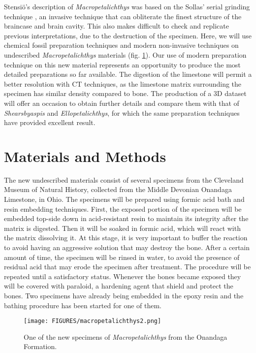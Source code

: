 \documentclass[11pt,letterpaper]{report}
\begin{document}
Stensi{\"o}'s description of \textit{Macropetalichthys} was based on the Sollas' serial grinding technique \citep{sollas1904method,Sollas201}, an invasive technique that can obliterate the finest structure of the braincase and brain cavity. This also makes difficult to check and replicate previous interpretations, due to the destruction of the specimen. Here, we will use chemical fossil preparation techniques and modern non-invasive techniques on undescribed \textit{Macropetalichthys} materials (fig. \ref{macro}). Our use of modern preparation technique on this new material represents an opportunity to produce the most detailed preparations so far available. The digestion of the limestone will permit a better resolution with CT techniques, as the limestone matrix surrounding the specimen has similar density compared to bone. The production of a 3D dataset will offer an occasion to obtain further details and compare them with that of \textit{Shearsbyaspis} and \textit{Ellopetalichthys}, for which the same preparation techniques have provided excellent result. 

\section{Materials and Methods}
The new undescribed materials consist of several specimens from the Cleveland Museum of Natural History, collected from the Middle Devonian Onandaga Limestone, in Ohio. The specimens will be prepared using formic acid bath and resin embedding techniques. First, the exposed portion of the specimen will be embedded top-side down in acid-resistant resin to maintain its integrity after the matrix is digested. Then it will be soaked in formic acid, which will react with the matrix dissolving it. At this stage, it is very important to buffer the reaction to avoid having an aggressive solution that may destroy the bone. After a certain amount of time, the specimen will be rinsed in water, to avoid the presence of residual acid that may erode the specimen after treatment. The procedure will be repeated until a satisfactory status. Whenever the bones became exposed they will be covered with paraloid, a hardening agent that shield and protect the bones. Two specimens have already being embedded in the epoxy resin and the bathing procedure has been started for one of them. 

\begin{figure}[!h]
\centering
    \texttt{[image: FIGURES/macropetalichthys2.png]}
\caption{\footnotesize{One of the new specimens of \textit{Macropetalichthys} from the Onandaga Formation.}}
\label{macro}
\end{figure}
\end{document}
